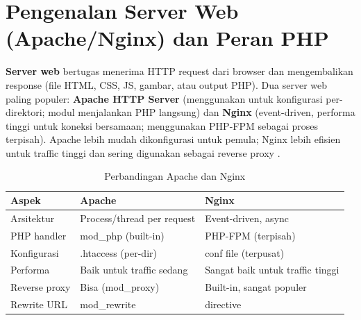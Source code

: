 ﻿\section{Pengenalan Server Web (Apache/Nginx) dan Peran PHP}

\textbf{Server web} bertugas menerima HTTP request dari browser dan mengembalikan response (file HTML, CSS, JS, gambar, atau output PHP). Dua server web paling populer: \textbf{Apache HTTP Server} (menggunakan  untuk konfigurasi per-direktori; modul  menjalankan PHP langsung) dan \textbf{Nginx} (event-driven, performa tinggi untuk koneksi bersamaan; menggunakan PHP-FPM sebagai proses terpisah). Apache lebih mudah dikonfigurasi untuk pemula; Nginx lebih efisien untuk traffic tinggi dan sering digunakan sebagai reverse proxy \cite{mdnDeploy}.

\begin{table}[H]
\centering
\begin{tabular}{|P{3cm}|P{5cm}|P{5cm}|}
\hline
\textbf{Aspek} & \textbf{Apache} & \textbf{Nginx} \\
\hline
Arsitektur & Process/thread per request & Event-driven, async \\
\hline
PHP handler & mod\_php (built-in) & PHP-FPM (terpisah) \\
\hline
Konfigurasi & .htaccess (per-dir) & conf file (terpusat) \\
\hline
Performa & Baik untuk traffic sedang & Sangat baik untuk traffic tinggi \\
\hline
Reverse proxy & Bisa (mod\_proxy) & Built-in, sangat populer \\
\hline
Rewrite URL & mod\_rewrite &  directive \\
\hline
\end{tabular}
\caption{Perbandingan Apache dan Nginx}
\end{table}

